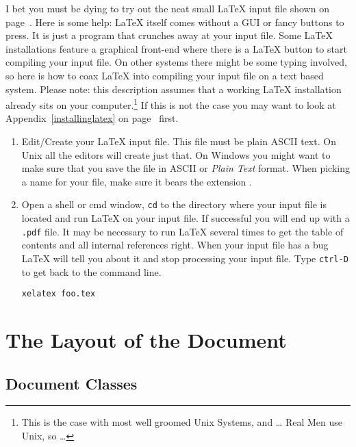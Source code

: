 I bet you must be dying to try out the neat small \LaTeX{} input file
shown on page~\pageref{mini}. Here is some help:
\LaTeX{} itself comes without a GUI or
fancy buttons to press. It is just a program that crunches away at your
input file. Some \LaTeX{} installations feature a graphical front-end where
there is a \LaTeX{} button to start compiling your input file. On other systems
there might be some typing involved, so here is how to coax \LaTeX{} into
compiling your input file on a text based system. Please note: this
description assumes that a working \LaTeX{} installation already sits on
your computer.\footnote{This is the case with most well groomed Unix
  Systems, and \ldots{} Real Men use Unix, so \ldots{} \smiley} If this is
not the case you may want to look at Appendix~\ref{installinglatex}
on page~\pageref{installinglatex} first.

\begin{enumerate}
  \item

        Edit/Create your \LaTeX{} input file. This file must be plain ASCII
        text.  On Unix all the editors will create just that. On Windows you
        might want to make sure that you save the file in ASCII or
        \emph{Plain Text} format.  When picking a name for your file, make
        sure it bears the extension .

  \item

        Open a shell or cmd window, \texttt{cd} to the directory where your input file is located and run \LaTeX{} on your input file. If successful you will end up with a
        \texttt{.pdf} file. It may be necessary to run \LaTeX{} several times to get
        the table of contents and all internal references right. When your input
        file has a bug \LaTeX{} will tell you about it and stop processing your
        input file. Type \texttt{ctrl-D} to get back to the command line.
        \begin{lscommand}
          \verb+xelatex foo.tex+
        \end{lscommand}

\end{enumerate}


\section{The Layout of the Document}

\subsection{Document Classes}\label{sec:documentclass}

